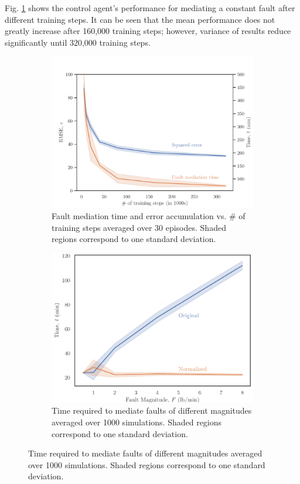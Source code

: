 Fig. \ref{fig:training_time} shows the control agent's performance for mediating a constant fault after different training steps. It can be seen that the mean performance does not greatly increase after 160,000 training steps; however, variance of results reduce significantly until 320,000  training steps.
\begin{figure}[H]
    \begin{center}
    \begin{subfigure}[b]{0.49\textwidth}
        \includegraphics[width=\textwidth]{images/ftc/training_time.pdf}
        \caption{{\scriptsize Fault mediation time and error accumulation vs. \# of training steps averaged over 30 episodes. Shaded regions correspond to one standard deviation.}}
        \label{fig:training_time} 
    \end{subfigure}
    \begin{subfigure}[b]{0.46\textwidth}
        \includegraphics[width=\textwidth]{images/ftc/time_to_mediate.pdf}
        \caption{\label{fig:time_to_mediate} {\scriptsize Time required to mediate faults of different magnitudes averaged over 1000 simulations.  Shaded regions correspond to one standard deviation.}}
    \end{subfigure}
    \end{center}
\end{figure}

